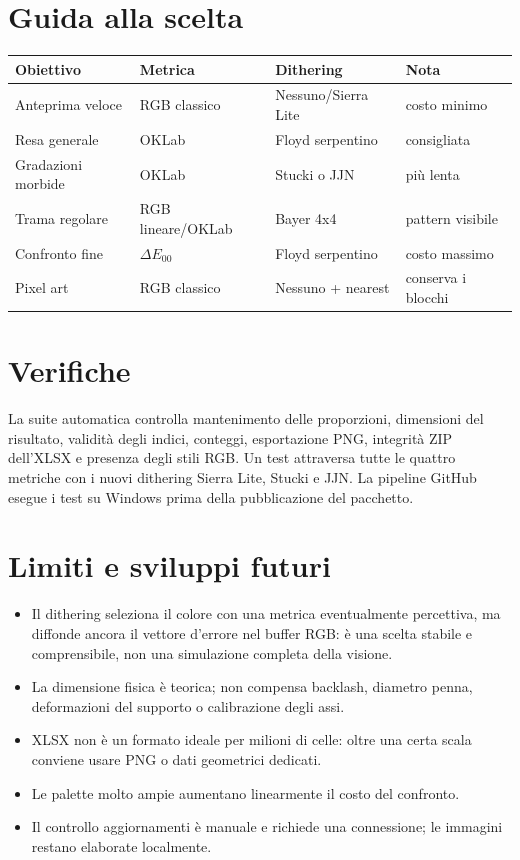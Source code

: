 \documentclass[11pt,a4paper]{article}
\begin{document}
\section{Guida alla scelta}
\begin{center}\small
\begin{tabularx}{\textwidth}{@{}P{38mm}P{38mm}LL@{}}\toprule
Obiettivo & Metrica & Dithering & Nota \\\midrule
Anteprima veloce & RGB classico & Nessuno/Sierra Lite & costo minimo \\
Resa generale & OKLab & Floyd serpentino & consigliata \\
Gradazioni morbide & OKLab & Stucki o JJN & più lenta \\
Trama regolare & RGB lineare/OKLab & Bayer 4x4 & pattern visibile \\
Confronto fine & $\Delta E_{00}$ & Floyd serpentino & costo massimo \\
Pixel art & RGB classico & Nessuno + nearest & conserva i blocchi \\\bottomrule
\end{tabularx}
\end{center}

\section{Verifiche}
La suite automatica controlla mantenimento delle proporzioni, dimensioni del risultato, validità degli indici, conteggi, esportazione PNG, integrità ZIP dell'XLSX e presenza degli stili RGB. Un test attraversa tutte le quattro metriche con i nuovi dithering Sierra Lite, Stucki e JJN. La pipeline GitHub esegue i test su Windows prima della pubblicazione del pacchetto.

\section{Limiti e sviluppi futuri}
\begin{itemize}[leftmargin=*]
\item Il dithering seleziona il colore con una metrica eventualmente percettiva, ma diffonde ancora il vettore d'errore nel buffer RGB: è una scelta stabile e comprensibile, non una simulazione completa della visione.
\item La dimensione fisica è teorica; non compensa backlash, diametro penna, deformazioni del supporto o calibrazione degli assi.
\item XLSX non è un formato ideale per milioni di celle: oltre una certa scala conviene usare PNG o dati geometrici dedicati.
\item Le palette molto ampie aumentano linearmente il costo del confronto.
\item Il controllo aggiornamenti è manuale e richiede una connessione; le immagini restano elaborate localmente.
\end{itemize}
\end{document}
